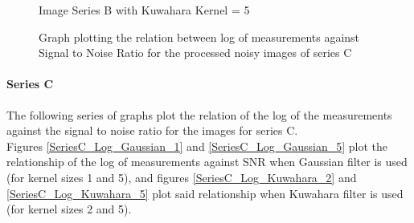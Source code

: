 \documentclass[runningheads]{llncs}
\begin{document}
\begin{figure}[h!]
\begin{minipage}[h]{0.47\linewidth}
\begin{center}
\caption{Image Series B with Kuwahara Kernel = 5}
\label{SeriesB_Log_Kuwahara_5}
\end{center}
\end{minipage}
\caption*{ Graph plotting the relation between log of measurements against Signal to Noise Ratio for the processed noisy images of series C}
\label{SeriesB_Log_SNR}
\end{figure}
\newpage
\paragraph*{\textbf{Series C}}
The following series of graphs plot the relation of the log of the measurements against the signal to noise ratio for the images for series C. 
~\\Figures \ref{SeriesC_Log_Gaussian_1} and \ref{SeriesC_Log_Gaussian_5} plot the relationship of the log of measurements against SNR when Gaussian filter is used (for kernel sizes 1 and 5), and figures \ref{SeriesC_Log_Kuwahara_2} and \ref{SeriesC_Log_Kuwahara_5} plot said relationship when Kuwahara filter is used (for kernel sizes 2 and 5).
\end{document}
